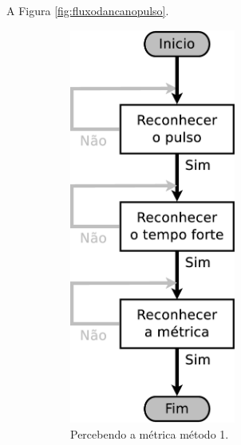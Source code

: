 A Figura \ref{fig:fluxodancanopulso}.

\begin{figure}[h]
    \centering 
\begin{subfigure}[c]{0.45\textwidth}
\centering 
\includegraphics[width=0.6\textwidth]{chapters/cap-musica-musicalidade/dancanopulso1.eps}
\caption{Percebendo a métrica método 1.}
\label{fig:fluxodancanopulso1}
\end{subfigure}
~%
\begin{subfigure}[c]{0.45\textwidth}
\centering 

\end{subfigure}
\end{figure}
